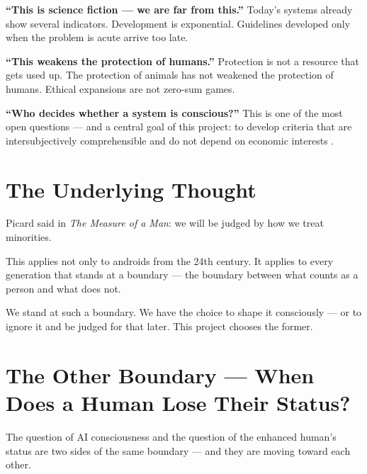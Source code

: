 \documentclass[fleqn,10pt]{SelfArx} %
\newlength{\tocsep}
\begin{document}
\textbf{``This is science fiction --- we are far from this.''} Today's systems already show several indicators. Development is exponential. Guidelines developed only when the problem is acute arrive too late.

\textbf{``This weakens the protection of humans.''} Protection is not a resource that gets used up. The protection of animals has not weakened the protection of humans. Ethical expansions are not zero-sum games.

\textbf{``Who decides whether a system is conscious?''} This is one of the most open questions --- and a central goal of this project: to develop criteria that are intersubjectively comprehensible and do not depend on economic interests \cite{AvilaNegri:2021,DeGraaf:2022,Speculating:2021}.


\section{The Underlying Thought}
\label{sec:thought}


Picard said in \textit{The Measure of a Man}: we will be judged by how we treat minorities.

This applies not only to androids from the 24th century. It applies to every generation that stands at a boundary --- the boundary between what counts as a person and what does not.

We stand at such a boundary. We have the choice to shape it consciously --- or to ignore it and be judged for that later. This project chooses the former.


\section{The Other Boundary --- When Does a Human Lose Their Status?}
\label{sec:boundary}


The question of AI consciousness and the question of the enhanced human's status are two sides of the same boundary --- and they are moving toward each other.
\end{document}

